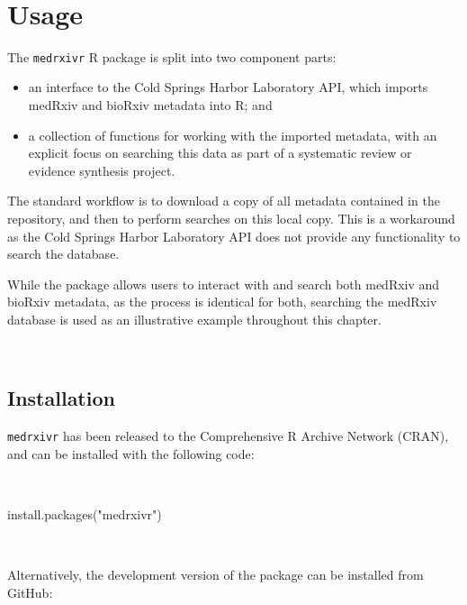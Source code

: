 \documentclass[a4paper, twoside]{templates/ociamthesis}
\providecommand{\tightlist}{%
  \setlength{\itemsep}{0pt}\setlength{\parskip}{0pt}}
\newenvironment{Shaded}{\begin{snugshade}}{\end{snugshade}}
\newcommand{\FunctionTok}[1]{\textcolor[rgb]{0.00,0.00,0.00}{#1}}
\newcommand{\NormalTok}[1]{#1}
\newcommand{\StringTok}[1]{\textcolor[rgb]{0.31,0.60,0.02}{#1}}
\renewenvironment{Shaded}
{
  \vspace{4pt}%
  \begin{snugshade}%
}{%
  \end{snugshade}%
  \vspace{4pt}%
}
\begin{document}
~

\hypertarget{usage}{%
\section{Usage}\label{usage}}

The \texttt{medrxivr} R package is split into two component parts:

\begin{itemize}
\tightlist
\item
  an interface to the Cold Springs Harbor Laboratory API, which imports medRxiv and bioRxiv metadata into R; and
\item
  a collection of functions for working with the imported metadata, with an explicit focus on searching this data as part of a systematic review or evidence synthesis project.
\end{itemize}

The standard workflow is to download a copy of all metadata contained in the repository, and then to perform searches on this local copy. This is a workaround as the Cold Springs Harbor Laboratory API does not provide any functionality to search the database.

While the package allows users to interact with and search both medRxiv and bioRxiv metadata, as the process is identical for both, searching the medRxiv database is used as an illustrative example throughout this chapter.

~

\hypertarget{installation}{%
\subsection{Installation}\label{installation}}

\texttt{medrxivr} has been released to the Comprehensive R Archive Network (CRAN), and can be installed with the following code:

~

\begin{Shaded}
\begin{Highlighting}[]
\FunctionTok{install.packages}\NormalTok{(}\StringTok{"medrxivr"}\NormalTok{)}
\end{Highlighting}
\end{Shaded}

~

Alternatively, the development version of the package can be installed from GitHub:

~
\end{document}
